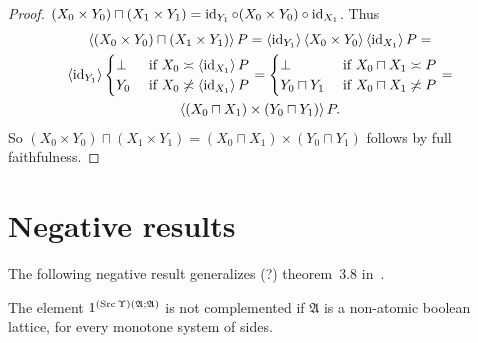 \begin{proof}
$(X_0\times Y_0)\sqcap(X_1\times Y_1) = \operatorname{id}_{Y_1}\circ(X_0\times Y_0)\circ\operatorname{id}_{X_1}$.
Thus
\begin{multline*}
\left\langle (X_0\times Y_0)\sqcap(X_1\times Y_1)\right\rangle P = \left\langle \operatorname{id}_{Y_1}\right\rangle\left\langle X_0\times Y_0\right\rangle\left\langle \operatorname{id}_{X_1}\right\rangle P = \\
\left\langle \operatorname{id}_{Y_1}\right\rangle\begin{cases}\bot&\text{ if }X_0\asymp\left\langle \operatorname{id}_{X_1}\right\rangle P\\Y_0&\text{ if }X_0\not\asymp\left\langle \operatorname{id}_{X_1}\right\rangle P\end{cases} =
\begin{cases}\bot&\text{ if }X_0\sqcap X_1\asymp P\\Y_0\sqcap Y_1&\text{ if }X_0\sqcap X_1\not\asymp P\end{cases} = \\
\left\langle (X_0\sqcap X_1)\times(Y_0\sqcap Y_1)\right\rangle P.
\end{multline*}
So $(X_0\times Y_0)\sqcap(X_1\times Y_1) = (X_0\sqcap X_1)\times(Y_0\sqcap Y_1)$ follows by full faithfulness.
\end{proof}



\section{Negative results}

The following negative result generalizes (?) theorem~3.8 in~\cite{tprod-dist-lat}.

\begin{prop}
  The element $1^{(\operatorname{Src}\Upsilon)(\mathfrak{A}; \mathfrak{A})}$ is not
  complemented if $\mathfrak{A}$ is a non-atomic boolean lattice,
  for every monotone system of sides.
\end{prop}

